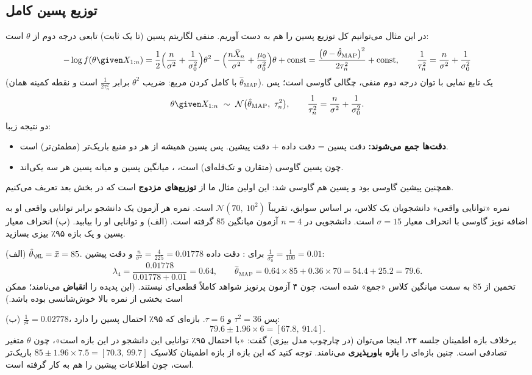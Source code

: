 \subsection{توزیع پسین کامل}
در این مثال می‌توانیم کل توزیع پسین را هم به دست آوریم. منفی لگاریتم پسین (تا یک ثابت) تابعی درجه دوم از $\theta$ است:
\[
-\log f(\theta\given X_{1:n})=\frac{1}{2}\Big(\frac{n}{\sigma^2}+\frac{1}{\sigma_0^2}\Big)\theta^2-\Big(\frac{n\bar X_n}{\sigma^2}+\frac{\mu_0}{\sigma_0^2}\Big)\theta+\text{const}
=\frac{\big(\theta-\hat\theta_{\mathrm{MAP}}\big)^2}{2\tau_n^2}+\text{const},
\qquad\frac{1}{\tau_n^2}=\frac{n}{\sigma^2}+\frac{1}{\sigma_0^2}
\]
(با کامل کردن مربع: ضریب $\theta^2$ برابر $\frac{1}{2\tau_n^2}$ است و نقطه کمینه همان $\hat\theta_{\mathrm{MAP}}$). یک تابع نمایی با توان درجه دوم منفی، چگالی گاوسی است؛ پس
\[
\theta\given X_{1:n}\ \sim\ \mathcal N\big(\hat\theta_{\mathrm{MAP}},\ \tau_n^2\big),\qquad\frac{1}{\tau_n^2}=\frac{n}{\sigma^2}+\frac{1}{\sigma_0^2}.
\]
دو نتیجه زیبا:
\begin{itemize}
\item \textbf{دقت‌ها جمع می‌شوند:} دقت پسین = دقت داده + دقت پیشین. پس پسین همیشه از هر دو منبع باریک‌تر (مطمئن‌تر) است.
\item چون پسین گاوسی (متقارن و تک‌قله‌ای) است، ، میانگین پسین و میانه پسین هر سه یکی‌اند.
\end{itemize}
همچنین پیشین گاوسی بود و پسین هم گاوسی شد: این اولین مثال ما از \textbf{توزیع‌های مزدوج} است که در بخش بعد تعریف می‌کنیم.

\begin{example}
نمره «توانایی واقعی» دانشجویان یک کلاس، بر اساس سوابق، تقریباً $\mathcal N(70,\ 10^2)$ است. نمره هر آزمون یک دانشجو برابر توانایی واقعی او به اضافه نویز گاوسی با انحراف معیار $\sigma=15$ است. دانشجویی در $n=4$ آزمون میانگین $85$ گرفته است. (الف)  و  توانایی او را بیابید. (ب) انحراف معیار پسین و یک بازه ۹۵٪ بیزی بسازید.
\begin{solution}
(الف) $\hat\theta_\ML=\bar x=85$. برای : دقت داده $\frac{n}{\sigma^2}=\frac{4}{225}=0.01778$ و دقت پیشین $\frac1{\sigma_0^2}=\frac1{100}=0.01$:
\[
\lambda_4=\frac{0.01778}{0.01778+0.01}=0.64,\qquad\hat\theta_{\mathrm{MAP}}=0.64\times85+0.36\times70=54.4+25.2=79.6 .
\]
تخمین از $85$ به سمت میانگین کلاس «جمع» شده است، چون ۴ آزمون پرنویز شواهد کاملاً قطعی‌ای نیستند. (این پدیده را \textbf{انقباض } می‌نامند؛ ممکن است بخشی از نمره بالا خوش‌شانسی بوده باشد.)

(ب) $\frac{1}{\tau^2}=0.02778$، پس $\tau^2=36$ و $\tau=6$. بازه‌ای که ۹۵٪ احتمال پسین را دارد:
\[
79.6\pm1.96\times6=[67.8,\ 91.4].
\]
برخلاف بازه اطمینان جلسه ۲۳، اینجا می‌توان (در چارچوب مدل بیزی) گفت: «با احتمال ۹۵٪ توانایی این دانشجو در این بازه است»، چون $\theta$ متغیر تصادفی است. چنین بازه‌ای را \textbf{بازه باورپذیری } می‌نامند. توجه کنید که این بازه از بازه اطمینان کلاسیک $85\pm1.96\times7.5=[70.3,\ 99.7]$ باریک‌تر است، چون اطلاعات پیشین را هم به کار گرفته است.
\end{solution}
\end{example}

